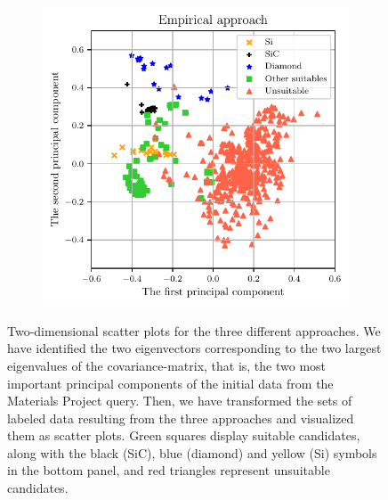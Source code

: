 \documentclass[superscriptaddress,unsortedaddress,
 amsmath,amssymb,
 aps,
]{revtex4-2}
\begin{document}
\begin{figure}
\begin{subfigure}{0.35\textwidth}
    \end{subfigure}
    \begin{subfigure}{0.4\textwidth}
        \centering
        \includegraphics[width=1\textwidth]{figures/pca-2d-plots/03-insightful-approach.pdf}
    \end{subfigure}
    \caption{Two-dimensional scatter plots for the three different approaches. We have identified the two eigenvectors corresponding to the two largest eigenvalues of the covariance-matrix, that is, the two most important principal components of the initial data from the Materials Project query. Then, we have transformed the sets of labeled data resulting from the three approaches and visualized them as scatter plots. Green squares display suitable candidates, along with the black (SiC), blue (diamond) and yellow (Si) symbols in the bottom panel, and red triangles represent unsuitable candidates.}
    \label{fig:2dscatterplotpca}
\end{figure}
\end{document}
